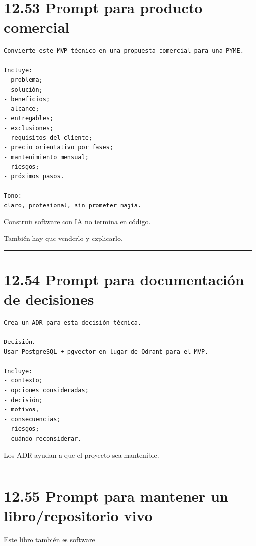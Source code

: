 \section{12.53 Prompt para producto
comercial}\label{prompt-para-producto-comercial}

\begin{lstlisting}
Convierte este MVP técnico en una propuesta comercial para una PYME.

Incluye:
- problema;
- solución;
- beneficios;
- alcance;
- entregables;
- exclusiones;
- requisitos del cliente;
- precio orientativo por fases;
- mantenimiento mensual;
- riesgos;
- próximos pasos.

Tono:
claro, profesional, sin prometer magia.
\end{lstlisting}

Construir software con IA no termina en código.

También hay que venderlo y explicarlo.

\begin{center}\rule{0.5\linewidth}{0.5pt}\end{center}

\section{12.54 Prompt para documentación de
decisiones}\label{prompt-para-documentaciuxf3n-de-decisiones}

\begin{lstlisting}
Crea un ADR para esta decisión técnica.

Decisión:
Usar PostgreSQL + pgvector en lugar de Qdrant para el MVP.

Incluye:
- contexto;
- opciones consideradas;
- decisión;
- motivos;
- consecuencias;
- riesgos;
- cuándo reconsiderar.
\end{lstlisting}

Los ADR ayudan a que el proyecto sea mantenible.

\begin{center}\rule{0.5\linewidth}{0.5pt}\end{center}

\section{12.55 Prompt para mantener un libro/repositorio
vivo}\label{prompt-para-mantener-un-librorepositorio-vivo}

Este libro también es software.

